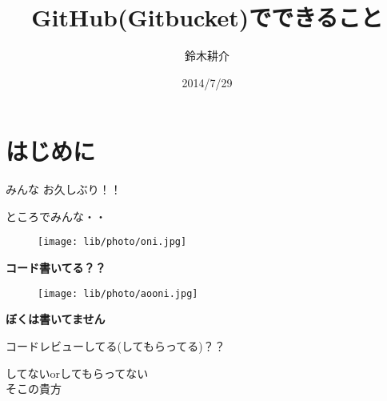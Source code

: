 \documentclass[dvipdfmx]{beamer}
\title{GitHub(Gitbucket)でできること}
\author{鈴木耕介}
\institute[]{}
\date{2014/7/29}
\begin{document}
\frame{\titlepage}

\section{はじめに}
\begin{frame}{}
\begin{center}
{\Huge みんな
お久しぶり！！}
\end{center}
\end{frame}

\begin{frame}
\begin{center}
\begin{Huge}
ところでみんな・・
\end{Huge}
\end{center}
\end{frame}

\begin{frame}
\begin{figure}
\texttt{[image: lib/photo/oni.jpg]}
\end{figure}

\begin{center}
\begin{Huge}
\textbf{\color{red}コード書いてる？？}
\end{Huge}
\end{center}
\end{frame}

\begin{frame}
\begin{figure}
\texttt{[image: lib/photo/aooni.jpg]}
\end{figure}

\begin{center}
\vspace{4cm}
\begin{Huge}
\textbf{\color{red}ぼくは書いてません}
\end{Huge}
\end{center}
\end{frame}

\begin{frame}
\begin{center}
\begin{Huge}
コードレビューしてる(してもらってる)？？
\end{Huge}
\end{center}
\end{frame}

\begin{frame}
\begin{center}
\begin{Huge}
してないorしてもらってない\\
そこの貴方
\end{Huge}
\end{center}
\end{frame}
\end{document}
